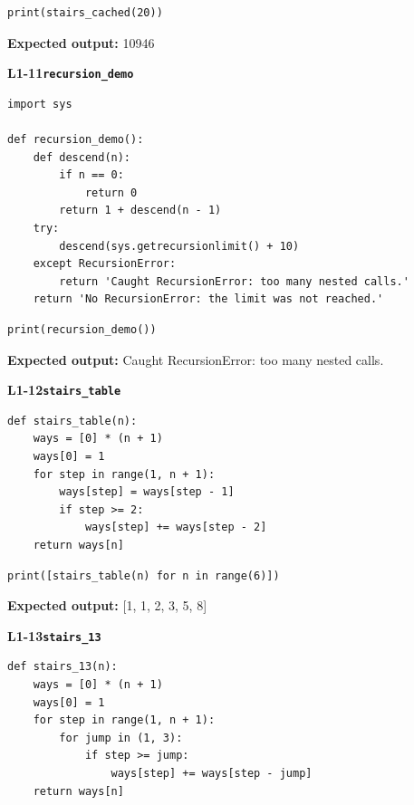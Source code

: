 \documentclass[11pt,a4paper]{article}
\begin{document}
\begin{lstlisting}
print(stairs_cached(20))
\end{lstlisting}
\textbf{Expected output:} 10946
\par\bigskip
{}
{\color{teal}\textbf{L1-11}}\quad\textbf{\texttt{recursion\_demo}}\label{L1-code-recursion_demo}\par
\begin{lstlisting}[style=numbered]
import sys

def recursion_demo():
    def descend(n):
        if n == 0:
            return 0
        return 1 + descend(n - 1)
    try:
        descend(sys.getrecursionlimit() + 10)
    except RecursionError:
        return 'Caught RecursionError: too many nested calls.'
    return 'No RecursionError: the limit was not reached.'
\end{lstlisting}

\begin{lstlisting}
print(recursion_demo())
\end{lstlisting}
\textbf{Expected output:} Caught RecursionError: too many nested calls.
\par\bigskip
{}
{\color{teal}\textbf{L1-12}}\quad\textbf{\texttt{stairs\_table}}\label{L1-code-stairs_table}\par
\begin{lstlisting}[style=numbered]
def stairs_table(n):
    ways = [0] * (n + 1)
    ways[0] = 1
    for step in range(1, n + 1):
        ways[step] = ways[step - 1]
        if step >= 2:
            ways[step] += ways[step - 2]
    return ways[n]
\end{lstlisting}

\begin{lstlisting}
print([stairs_table(n) for n in range(6)])
\end{lstlisting}
\textbf{Expected output:} [1, 1, 2, 3, 5, 8]
\par\bigskip
{}
{\color{teal}\textbf{L1-13}}\quad\textbf{\texttt{stairs\_13}}\label{L1-code-stairs_13}\par
\begin{lstlisting}[style=numbered]
def stairs_13(n):
    ways = [0] * (n + 1)
    ways[0] = 1
    for step in range(1, n + 1):
        for jump in (1, 3):
            if step >= jump:
                ways[step] += ways[step - jump]
    return ways[n]
\end{lstlisting}
\end{document}
